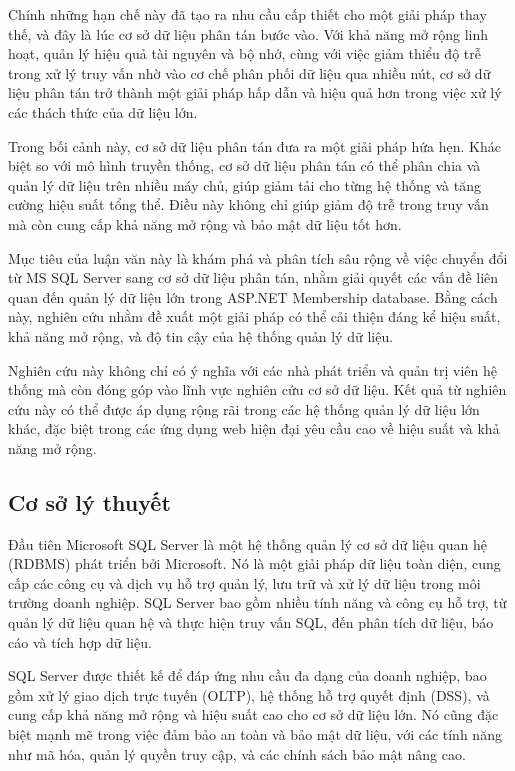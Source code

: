 \documentclass{article}[14pt]
\begin{document}
{{Chính những hạn chế này đã tạo ra nhu cầu cấp thiết cho một giải pháp thay thế, và đây là lúc cơ sở dữ liệu phân tán bước vào. Với khả năng mở rộng linh hoạt, quản lý hiệu quả tài nguyên và bộ nhớ, cùng với việc giảm thiểu độ trễ trong xử lý truy vấn nhờ vào cơ chế phân phối dữ liệu qua nhiều nút, cơ sở dữ liệu phân tán trở thành một giải pháp hấp dẫn và hiệu quả hơn trong việc xử lý các thách thức của dữ liệu lớn.

Trong bối cảnh này, cơ sở dữ liệu phân tán đưa ra một giải pháp hứa hẹn. Khác biệt so với mô hình truyền thống, cơ sở dữ liệu phân tán có thể phân chia và quản lý dữ liệu trên nhiều máy chủ, giúp giảm tải cho từng hệ thống và tăng cường hiệu suất tổng thể. Điều này không chỉ giúp giảm độ trễ trong truy vấn mà còn cung cấp khả năng mở rộng và bảo mật dữ liệu tốt hơn.

Mục tiêu của luận văn này là khám phá và phân tích sâu rộng về việc chuyển đổi từ MS SQL Server sang cơ sở dữ liệu phân tán, nhằm giải quyết các vấn đề liên quan đến quản lý dữ liệu lớn trong ASP.NET Membership database. Bằng cách này, nghiên cứu nhằm đề xuất một giải pháp có thể cải thiện đáng kể hiệu suất, khả năng mở rộng, và độ tin cậy của hệ thống quản lý dữ liệu.

Nghiên cứu này không chỉ có ý nghĩa với các nhà phát triển và quản trị viên hệ thống mà còn đóng góp vào lĩnh vực nghiên cứu cơ sở dữ liệu. Kết quả từ nghiên cứu này có thể được áp dụng rộng rãi trong các hệ thống quản lý dữ liệu lớn khác, đặc biệt trong các ứng dụng web hiện đại yêu cầu cao về hiệu suất và khả năng mở rộng.

\subsection{Cơ sở lý thuyết}
Đầu tiên Microsoft SQL Server là một hệ thống quản lý cơ sở dữ liệu quan hệ (RDBMS) phát triển bởi Microsoft. Nó là một giải pháp dữ liệu toàn diện, cung cấp các công cụ và dịch vụ hỗ trợ quản lý, lưu trữ và xử lý dữ liệu trong môi trường doanh nghiệp. SQL Server bao gồm nhiều tính năng và công cụ hỗ trợ, từ quản lý dữ liệu quan hệ và thực hiện truy vấn SQL, đến phân tích dữ liệu, báo cáo và tích hợp dữ liệu.

SQL Server được thiết kế để đáp ứng nhu cầu đa dạng của doanh nghiệp, bao gồm xử lý giao dịch trực tuyến (OLTP), hệ thống hỗ trợ quyết định (DSS), và cung cấp khả năng mở rộng và hiệu suất cao cho cơ sở dữ liệu lớn. Nó cũng đặc biệt mạnh mẽ trong việc đảm bảo an toàn và bảo mật dữ liệu, với các tính năng như mã hóa, quản lý quyền truy cập, và các chính sách bảo mật nâng cao.



}}
\end{document}

